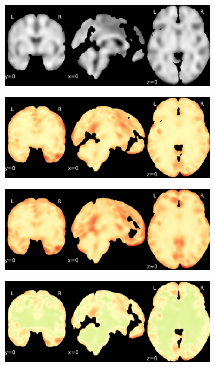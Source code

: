 \documentclass{article}
\begin{document}
\begin{appendices}
\begin{landscape}
\begin{figure}
            \begin{subfigure}[t]{0.2\paperheight}
                \centering
                \includegraphics[width=\textwidth]{figures/sig/10mm/ieee_ds000256_sub-CTS210.pdf}
            \end{subfigure}
            \begin{subfigure}[t]{0.2\paperheight}
                \centering
                \includegraphics[width=\textwidth]{figures/sig/10mm/rr_ds000256_sub-CTS210_sig.pdf}
            \end{subfigure}
            \begin{subfigure}[t]{0.2\paperheight}
                \centering
                \includegraphics[width=\textwidth]{figures/sig/10mm/rs_ds000256_sub-CTS210_sig.pdf}
            \end{subfigure}
            \begin{subfigure}[t]{0.2\paperheight}
                \centering
                \includegraphics[width=\textwidth]{figures/sig/10mm/rr.rs_ds000256_sub-CTS210_sig.pdf}

\end{subfigure}
\end{figure}
\end{landscape}
\end{appendices}
\end{document}
